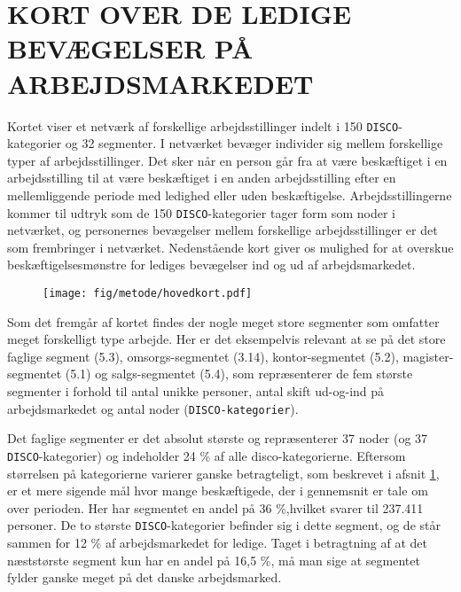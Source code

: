 




\section{KORT OVER DE LEDIGE BEVÆGELSER PÅ ARBEJDSMARKEDET \label{}}

Kortet viser et netværk af forskellige arbejdsstillinger indelt i 150 \texttt{DISCO}-kategorier og 32 segmenter. I netværket bevæger individer sig mellem forskellige typer af arbejdsstillinger. Det sker når en person går fra at være beskæftiget i en arbejdsstilling til at være beskæftiget i en anden arbejdsstilling efter en mellemliggende periode med ledighed eller uden beskæftigelse. Arbejdsstillingerne kommer til udtryk som de 150 \texttt{DISCO}-kategorier  tager form som noder i netværket, og personernes bevægelser mellem forskellige arbejdsstillinger er det som frembringer  i netværket. Nedenstående kort giver os mulighed for at overskue beskæftigelsesmønstre for lediges bevægelser ind og ud af arbejdsmarkedet.
% 
\begin{figure}[h]
\begin{centering}
	\texttt{[image: fig/metode/hovedkort.pdf]}
	\label{fig_hist_beskaeftigede_allekategorier}
\end{centering}
\end{figure}

Som det fremgår af kortet findes der nogle meget store segmenter som omfatter meget forskelligt type arbejde. Her er det eksempelvis relevant at se på det store faglige segment (5.3), omsorgs-segmentet (3.14), kontor-segmentet (5.2), magister-segmentet (5.1) og salgs-segmentet (5.4), som repræsenterer de fem største segmenter i forhold til antal unikke personer, antal skift ud-og-ind på arbejdsmarkedet og antal noder (\texttt{DISCO-kategorier}). 

Det faglige segmenter er det absolut største og repræsenterer 37 noder (og 37 \texttt{DISCO}-kategorier) og indeholder 24 \% af alle disco-kategorierne. Eftersom størrelsen på kategorierne varierer ganske betragteligt, som beskrevet i afsnit \ref{fig_hist_beskaeftigede_allekategorier}, er et mere sigende mål hvor mange beskæftigede, der i gennemsnit er tale om over perioden. Her har segmentet en andel på 36 \%,hvilket svarer til 237.411 personer. De to største \texttt{DISCO}-kategorier befinder sig i dette segment, og de står sammen for 12 \% af arbejdsmarkedet for ledige. Taget i betragtning af at det næststørste segment kun har en andel på 16,5 \%, må man sige at segmentet fylder ganske meget på det danske arbejdsmarked. 

